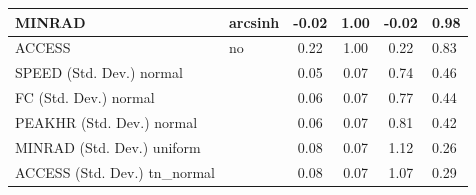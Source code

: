 \begin{table}
\begin{center}
\begin{tabular}{|l|l|c|c|c|l|}
			\hline
			MINRAD & arcsinh & -0.02 & 1.00 & -0.02 & 0.98 \\
			\hline
			ACCESS & no & 0.22 & 1.00 & 0.22 & 0.83 \\
			\hline
			SPEED (Std. Dev.) normal &  & 0.05 & 0.07 & 0.74 & 0.46 \\
			\hline
			FC (Std. Dev.) normal &  & 0.06 & 0.07 & 0.77 & 0.44 \\
			\hline
			PEAKHR (Std. Dev.) normal &  & 0.06 & 0.07 & 0.81 & 0.42 \\
			\hline
			MINRAD (Std. Dev.) uniform &  & 0.08 & 0.07 & 1.12 & 0.26 \\
			\hline
			ACCESS (Std. Dev.) tn_normal &  & 0.08 & 0.07 & 1.07 & 0.29 \\
			\hline
		\end{tabular}
	\end{center}
\end{table}